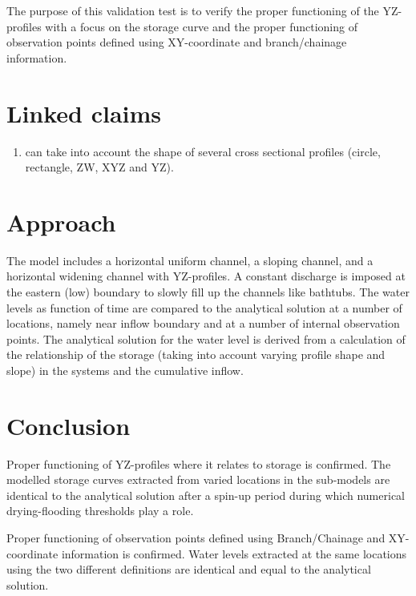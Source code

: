 The purpose of this validation test is to verify the proper functioning of the YZ-profiles with a focus on the storage curve and the proper functioning of observation points defined using XY-coordinate and branch/chainage information.


\section*{Linked claims}
\begin{enumerate}
\item \dflowfm can take into account the shape of several cross sectional profiles (circle, rectangle, ZW, XYZ and YZ).
\end{enumerate}

\section*{Approach}

The model includes a horizontal uniform channel, a sloping channel, and a horizontal widening channel with YZ-profiles.
A constant discharge is imposed at the eastern (low) boundary to slowly fill up the channels like bathtubs.
The water levels as function of time are compared to the analytical solution at a number of locations, namely near inflow boundary and at a number of internal observation points.
The analytical solution for the water level is derived from a calculation of the relationship of the storage (taking into account varying profile shape and slope) in the systems and the cumulative inflow.


\section*{Conclusion} 
Proper functioning of YZ-profiles where it relates to storage is confirmed. 
The modelled storage curves extracted from varied locations in the sub-models are identical to the analytical solution after a spin-up period during which numerical drying-flooding thresholds play a role.

Proper functioning of observation points defined using Branch/Chainage and XY-coordinate information is confirmed. 
Water levels extracted at the same locations using the two different definitions are identical and equal to the analytical solution. 

